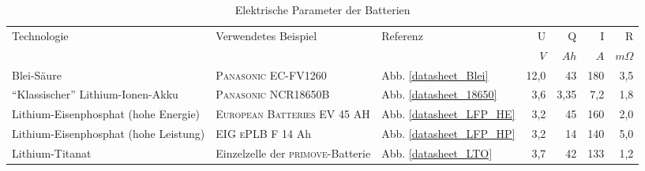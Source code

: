 \begin{table}[h]\centering
	\begin{tabulary}{\textwidth}{LLlRRRR}
		\toprule
		Technologie                           & Verwendetes Beispiel                      & Referenz                        &    U &    Q &   I &         R \\
		                                      &                                           &                             &  $V$ & $Ah$ & $A$ & $m\Omega$ \\ \midrule
		Blei-Säure                            & \textsc{Panasonic} EC-FV1260              & Abb. \ref{datasheet_Blei}   & 12,0 &   43 & 180 &       3,5 \\
		"`Klassischer"' Lithium-Ionen-Akku    & \textsc{Panasonic} NCR18650B              & Abb. \ref{datasheet_18650}  &  3,6 & 3,35 & 7,2 &       1,8 \\
		Lithium-Eisenphosphat (hohe Energie)  & \textsc{European Batteries} EV 45 AH      & Abb. \ref{datasheet_LFP_HE} &  3,2 &   45 & 160 &       2,0 \\
		Lithium-Eisenphosphat (hohe Leistung) & \textsc{EIG ePLB} F 14 Ah                 & Abb. \ref{datasheet_LFP_HP} &  3,2 &   14 & 140 &       5,0 \\
		Lithium-Titanat                       & Einzelzelle der \textsc{primove}-Batterie & Abb. \ref{datasheet_LTO}    &  3,7 &   42 & 133 &       1,2 \\ \bottomrule
	\end{tabulary}
	\caption{Elektrische Parameter der Batterien}
	\label{vergleichstabellen_speichertechnologien_1}
\end{table}


